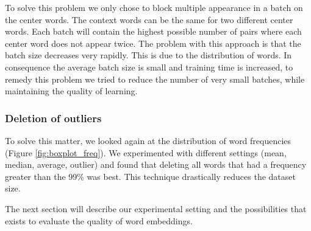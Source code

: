 To solve this problem we only chose to block multiple appearance in a batch on the center words. The context words can be the same for two different center words.  Each batch will contain the highest possible number of pairs where each center word does not appear twice. The problem with this approach is that the batch size decreases very rapidly. This is due to the distribution of words. In consequence the average batch size is small and training time is increased, to remedy this problem we tried to reduce the number of very small batches, while maintaining the quality of learning. 
\subsubsection{Deletion of outliers}
To solve this matter, we looked again at the distribution of word frequencies (Figure \ref{fig:boxplot_freq}). We experimented with different settings (mean, median, average, outlier) and found that deleting all words that had a frequency greater than the 99\% was best. 
This technique drastically reduces the dataset size. 

The next section will describe our experimental setting and the possibilities that exists to evaluate the quality of word embeddings. 